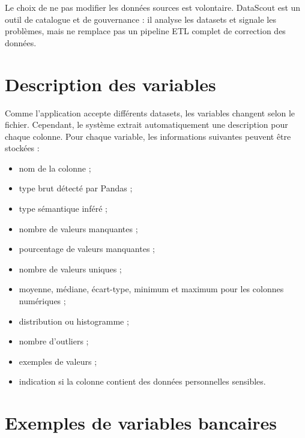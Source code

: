 \documentclass[12pt,a4paper]{report}
\begin{document}
Le choix de ne pas modifier les données sources est volontaire. DataScout est un outil de catalogue et de gouvernance : il analyse les datasets et signale les problèmes, mais ne remplace pas un pipeline ETL complet de correction des données.

\section{Description des variables}

Comme l'application accepte différents datasets, les variables changent selon le fichier. Cependant, le système extrait automatiquement une description pour chaque colonne. Pour chaque variable, les informations suivantes peuvent être stockées :

\begin{itemize}
    \item nom de la colonne ;
    \item type brut détecté par Pandas ;
    \item type sémantique inféré ;
    \item nombre de valeurs manquantes ;
    \item pourcentage de valeurs manquantes ;
    \item nombre de valeurs uniques ;
    \item moyenne, médiane, écart-type, minimum et maximum pour les colonnes numériques ;
    \item distribution ou histogramme ;
    \item nombre d'outliers ;
    \item exemples de valeurs ;
    \item indication si la colonne contient des données personnelles sensibles.
\end{itemize}

\section{Exemples de variables bancaires}
\end{document}
